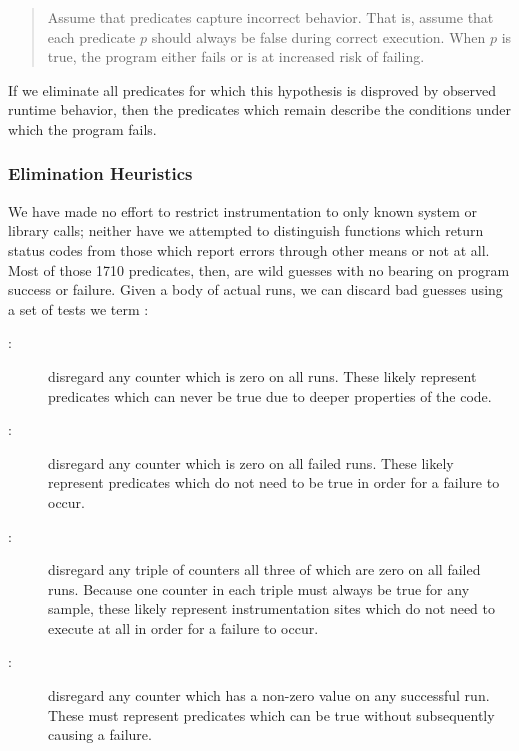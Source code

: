 \begin{quote}
  Assume that predicates capture incorrect behavior.  That is, assume
  that each predicate $p$ should always be false during correct
  execution.  When $p$ is true, the program either fails or is at
  increased risk of failing.
\end{quote}

If we eliminate all predicates for which this hypothesis is disproved
by observed runtime behavior, then the predicates which remain
describe the conditions under which the program fails.

\subsubsection{Elimination Heuristics}

We have made no effort to restrict instrumentation to only known
system or library calls; neither have we attempted to distinguish
functions which return status codes from those which report errors
through other means or not at all.  Most of those 1710 predicates,
then, are wild guesses with no bearing on program success or failure.
Given a body of actual runs, we can discard bad guesses using a set of
tests we term :

\begin{description}
\item[:] disregard any
  counter which is zero on all runs.  These likely represent
  predicates which can never be true due to deeper properties of the
  code.
  
\item[:] disregard any
  counter which is zero on all failed runs.  These likely represent
  predicates which do not need to be true in order for a failure to
  occur.
  
\item[:] disregard any
  triple of counters all three of which are zero on all failed runs.
  Because one counter in each triple must always be true for any
  sample, these likely represent instrumentation sites which do not
  need to execute at all in order for a failure to occur.
  
\item[:] disregard any
  counter which has a non-zero value on any successful run.  These
  must represent predicates which can be true without subsequently
  causing a failure.
\end{description}

